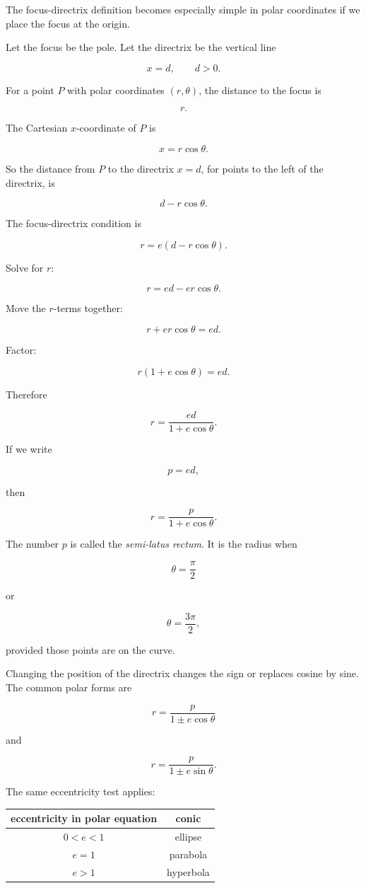 The focus-directrix definition becomes especially simple in polar coordinates if we place
the focus at the origin.

Let the focus be the pole.  Let the directrix be the vertical line

\[
x=d,
\qquad d>0.
\]

For a point \(P\) with polar coordinates \((r,\theta)\), the distance to the focus is

\[
r.
\]

The Cartesian \(x\)-coordinate of \(P\) is

\[
x=r\cos\theta.
\]

So the distance from \(P\) to the directrix \(x=d\), for points to the left of the directrix,
is

\[
d-r\cos\theta.
\]

The focus-directrix condition is

\[
r=e(d-r\cos\theta).
\]

Solve for \(r\):

\[
r=ed-er\cos\theta.
\]

Move the \(r\)-terms together:

\[
r+er\cos\theta=ed.
\]

Factor:

\[
r(1+e\cos\theta)=ed.
\]

Therefore

\[
r=\frac{ed}{1+e\cos\theta}.
\]

If we write

\[
p=ed,
\]

then

\[
\boxed{
r=\frac{p}{1+e\cos\theta}.
}
\]

The number \(p\) is called the \emph{semi-latus rectum}.  It is the radius when

\[
\theta=\frac{\pi}{2}
\]

or

\[
\theta=\frac{3\pi}{2},
\]

provided those points are on the curve.

Changing the position of the directrix changes the sign or replaces cosine by sine.  The
common polar forms are

\[
\boxed{
r=\frac{p}{1\pm e\cos\theta}
}
\]

and

\[
\boxed{
r=\frac{p}{1\pm e\sin\theta}.
}
\]

The same eccentricity test applies:

\begin{center}
\begin{tabular}{c|c}
\textbf{eccentricity in polar equation} & \textbf{conic} \\ \hline
\(0<e<1\) & ellipse \\
\(e=1\) & parabola \\
\(e>1\) & hyperbola
\end{tabular}
\end{center}

